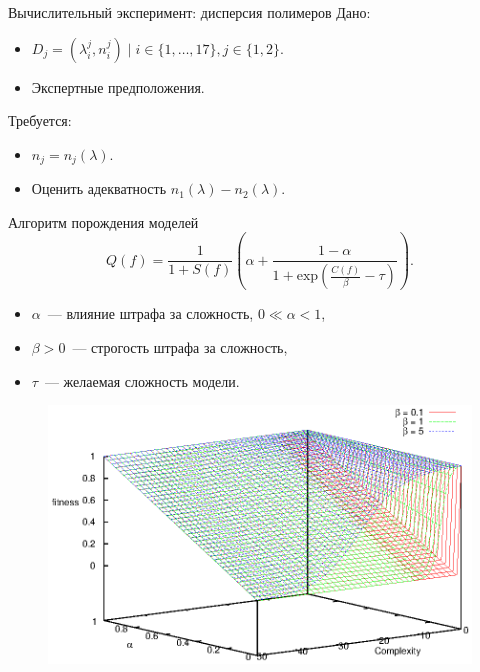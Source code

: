 \documentclass{beamer}
\begin{document}
\begin{frame}{Вычислительный эксперимент: дисперсия полимеров}
  Дано:
  \begin{itemize}
    \item $D_j = (\lambda_i^j, n_i^j) \mid i \in \{ 1, \dots, 17 \}, j \in \{ 1, 2 \}.$
    \item Экспертные предположения.
  \end{itemize}
  
  Требуется:
  \begin{itemize}
    \item $n_j = n_j(\lambda).$
    \item Оценить адекватность $n_1 (\lambda) - n_2 (\lambda)$.
  \end{itemize}
\end{frame}

\begin{frame}{Алгоритм порождения моделей}
  \[
    Q(f) = \frac{1}{1 + S(f)} \left(\alpha + \frac{1 - \alpha}{1 + \text{exp} (\frac{C(f)}{\beta} - \tau)}\right).
  \]
  \begin{itemize}
    \item $\alpha$~--- влияние штрафа за сложность, $0 \ll \alpha < 1$,
    \item $\beta > 0$~--- строгость штрафа за сложность,
    \item $\tau$~--- желаемая сложность модели.
  \end{itemize}

  \begin{figure}[h]
    \vspace{-20pt}
    \includegraphics[scale=0.5]{figs/fitness.eps}
    \vspace{-30pt}
  \end{figure}
\end{frame}
\end{document}
